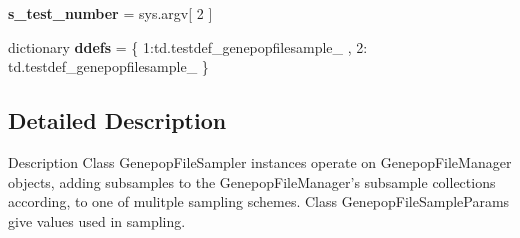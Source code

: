 \begin{DoxyCompactItemize}
\item 
{\bfseries s\+\_\+test\+\_\+number} = sys.\+argv\mbox{[} 2 \mbox{]}\hypertarget{namespacenegui_1_1genepopfilesampler_adc2001c9e9a7d948254b3cdc332a6977}{}\label{namespacenegui_1_1genepopfilesampler_adc2001c9e9a7d948254b3cdc332a6977}

\item 
dictionary {\bfseries ddefs} = \{ 1\+:td.\+testdef\+\_\+genepopfilesample\+\_ , 2\+: td.\+testdef\+\_\+genepopfilesample\+\_ \}\hypertarget{namespacenegui_1_1genepopfilesampler_a05caff4e04dff14a4594c4696dbd2496}{}\label{namespacenegui_1_1genepopfilesampler_a05caff4e04dff14a4594c4696dbd2496}

\end{DoxyCompactItemize}


\subsection{Detailed Description}
\begin{DoxyVerb}Description
Class GenepopFileSampler instances operate on GenepopFileManager objects,
adding subsamples to the GenepopFileManager's subsample collections according,
to one of mulitple sampling schemes.  Class GenepopFileSampleParams give 
values used in sampling.
\end{DoxyVerb}
 